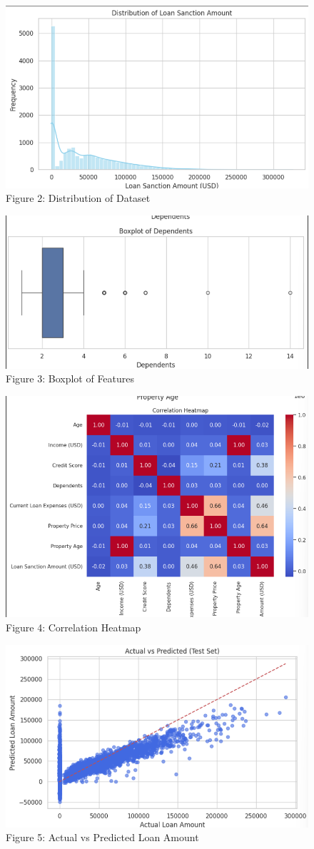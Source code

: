 \documentclass[12pt]{article}
\begin{document}
  \begin{figure}[H]
      \centering
      \includegraphics[width=0.5\linewidth]{im4.png}
      \caption{Figure 2: Distribution of Dataset}
      \label{fig:enter-label}
  \end{figure}
    \begin{figure}[H]
        \centering
        \includegraphics[width=0.5\linewidth]{im5.png}
        \caption{Figure 3: Boxplot of Features}
        \label{fig:enter-label}
    \end{figure}
  \begin{figure}[H]
      \centering
      \includegraphics[width=0.5\linewidth]{im.png}
      \caption{Figure 4: Correlation Heatmap}
      \label{fig:enter-label}
  \end{figure}
  \begin{figure}[H]
      \centering
      \includegraphics[width=0.5\linewidth]{im2.png}
      \caption{Figure 5: Actual vs Predicted Loan Amount}
      \label{fig:enter-label}
  \end{figure}
\end{document}
